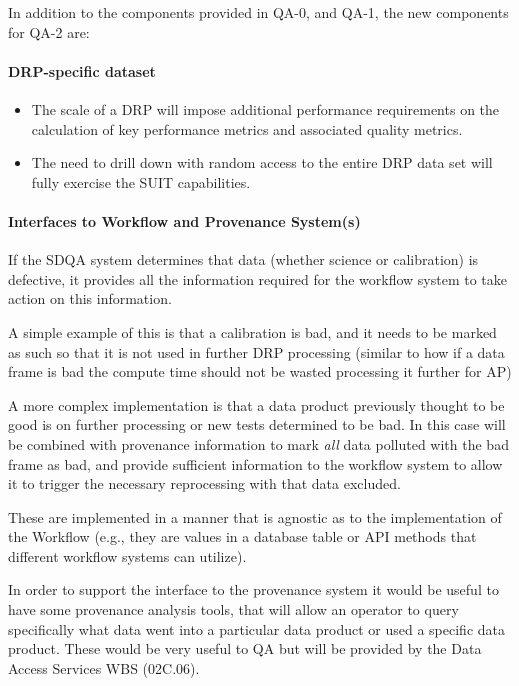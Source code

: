 In addition to the components provided in QA-0, and QA-1, the new components for QA-2 are:

\paragraph{DRP-specific dataset}
\label{sec:qaDrpDataset}
\begin{itemize}
\item The scale of a DRP will impose additional performance requirements on the calculation of key performance metrics and associated quality metrics.
\item The need to drill down with random access to the entire DRP data set will fully exercise the SUIT capabilities.
\end{itemize}


\paragraph{Interfaces to Workflow and Provenance System(s)}
\label{sec:qaOutputInterfaceWorkflowSystem}

If the SDQA system determines that data (whether science or calibration) is defective, it provides all the information required for the workflow system to take action on this information.

A simple example of this is that a calibration is bad, and it needs to be marked as such so that it is not used in further DRP processing (similar to how if a data frame is bad the compute time should not be wasted processing it further for AP)

A more complex implementation is that a data product previously thought to be good is on further processing or new tests determined to be bad. In this case will be combined with provenance information to mark \emph{all} data polluted with the bad frame as bad, and provide sufficient information to the workflow system to allow it to trigger the necessary reprocessing with that data excluded.

These are implemented in a manner that is agnostic as to the implementation of the Workflow (e.g., they are values in a database table or API methods that different workflow systems can utilize).

In order to support the interface to the provenance system it would be useful to have some provenance analysis tools, that will allow an operator to query specifically what data went into a particular data product or used a specific data product. These would be very useful to QA but will be provided by the Data Access Services WBS (02C.06).


